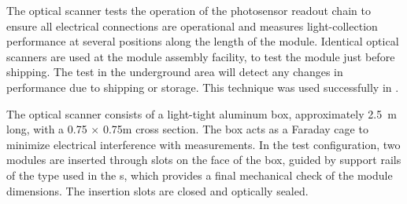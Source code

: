 The optical scanner tests the operation of the photosensor readout chain to ensure all electrical connections are operational and measures light-collection performance at several positions along the length of the module.  Identical optical scanners are used at the module assembly facility, to test the module just before shipping. The test in the underground area %
will detect any changes in performance due to shipping or storage.  This technique was used successfully in .

The optical scanner consists of a light-tight aluminum box, approximately \SI{2.5}{m} long, with a \num{0.75} $\times$ \num{0.75}m cross section. The box acts as a Faraday cage to minimize electrical interference with measurements. In the  test configuration, two  modules are inserted through slots on the face of the box, guided by support rails of the type used in the s, which provides a final mechanical check of the  module dimensions.  The insertion slots are closed and optically sealed. 

